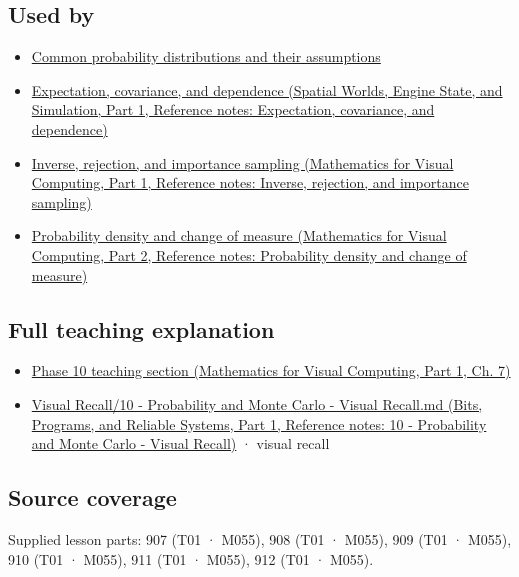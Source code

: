 \subsection{Used by}\label{appendix-4d0203f7944f-used-by}

\hypertarget{appendix-4d0203f7944f-used-by}{}

\begin{itemize}
\tightlist
\item
  \hyperref[appendix-a2360b435383]{Common probability distributions and their assumptions}
\item
  \href{../05-Spatial-Worlds-Engine-State-and-Simulation-P01/main.pdf\#appendix-54c383df9992}{Expectation, covariance, and dependence (Spatial Worlds, Engine State, and Simulation, Part 1, Reference notes: Expectation, covariance, and dependence)}
\item
  \href{../02-Mathematics-for-Visual-Computing-P01/main.pdf\#appendix-8d863ed954d0}{Inverse, rejection, and importance sampling (Mathematics for Visual Computing, Part 1, Reference notes: Inverse, rejection, and importance sampling)}
\item
  \href{../02-Mathematics-for-Visual-Computing-P02/main.pdf\#appendix-4815cd87ab8b}{Probability density and change of measure (Mathematics for Visual Computing, Part 2, Reference notes: Probability density and change of measure)}
\end{itemize}

\subsection{Full teaching explanation}\label{appendix-4d0203f7944f-full-teaching-explanation}

\hypertarget{appendix-4d0203f7944f-full-teaching-explanation}{}

\begin{itemize}
\tightlist
\item
  \href{../02-Mathematics-for-Visual-Computing-P01/main.pdf\#02-foundations-ii-ch023-random-quantities-and-their-probability-laws}{Phase 10 teaching section (Mathematics for Visual Computing, Part 1, Ch. 7)}
\item
  \href{../01-Bits-Programs-and-Reliable-Systems-P01/main.pdf\#appendix-cb5af353ef77}{Visual Recall/10 - Probability and Monte Carlo - Visual Recall.md (Bits, Programs, and Reliable Systems, Part 1, Reference notes: 10 - Probability and Monte Carlo - Visual Recall)} · visual recall
\end{itemize}

\subsection{Source coverage}\label{appendix-4d0203f7944f-source-coverage}

\hypertarget{appendix-4d0203f7944f-source-coverage}{}

Supplied lesson parts: 907 (T01 · M055), 908 (T01 · M055), 909 (T01 · M055), 910 (T01 · M055), 911 (T01 · M055), 912 (T01 · M055).
